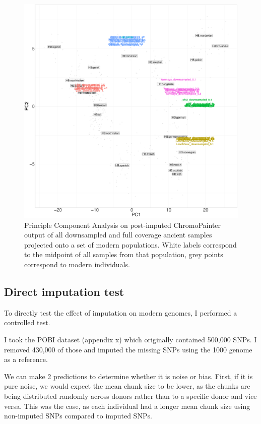 \begin{figure}[htp]
    \centering
    \includegraphics[width=1.0\textwidth]{../images/chapter1/CP_unlinked_PCA.pdf}
    \caption{Principle Component Analysis on post-imputed ChromoPainter output of all downsampled and full coverage ancient samples projected onto a set of modern populations. White labels correspond to the midpoint of all samples from that population, grey points correspond to modern individuals.}
    \label{fig:CP_unlinked_PCA}
\end{figure}


\subsection{Direct imputation test}

To directly test the effect of imputation on modern genomes, I performed a controlled test.

I took the POBI dataset (appendix x) which originally contained 500,000 SNPs. I removed 430,000 of those and imputed the missing SNPs using the 1000 genome as a reference.

We can make 2 predictions to determine whether it is noise or bias. First, if it is pure noise, we would expect the mean chunk size to be lower, as the chunks are being distributed randomly across donors rather than to a specific donor and vice versa. This was the case, as each individual had a longer mean chunk size using non-imputed SNPs compared to imputed SNPs.


